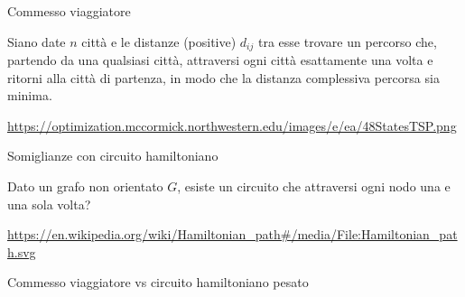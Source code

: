 \begin{frame}{Commesso viaggiatore}

\vspace{-9pt}
\begin{myboxtitle}
Siano date $n$ città e le distanze (positive) $d_{ij}$ tra esse
trovare un percorso
che, partendo da una qualsiasi città, attraversi ogni città esattamente una
volta e ritorni alla città di partenza, in modo che la distanza complessiva
percorsa sia minima.
\end{myboxtitle}

\begin{center}
\end{center}

\vfill
\tiny
\url{https://optimization.mccormick.northwestern.edu/images/e/ea/48StatesTSP.png}


\end{frame}

\begin{frame}{Somiglianze con circuito hamiltoniano}

\vspace{-9pt}
\begin{myboxtitle}
Dato un grafo non orientato $G$, esiste un circuito che attraversi ogni nodo
una e una sola volta?
\end{myboxtitle}

\begin{center}
\end{center}

\vfill
\tiny
\url{https://en.wikipedia.org/wiki/Hamiltonian\_path\#/media/File:Hamiltonian\_path.svg}

\end{frame}


\begin{frame}{Commesso viaggiatore vs circuito hamiltoniano pesato}


\end{frame}



